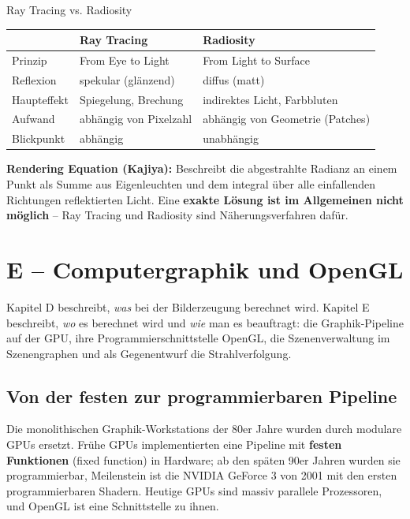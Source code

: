 \documentclass[12pt, a4paper]{article}
\begin{document}
\begin{notebox}{Ray Tracing vs. Radiosity}
\begin{tabular}{lll}
  & \textbf{Ray Tracing} & \textbf{Radiosity} \\
  \hline
  Prinzip & From Eye to Light & From Light to Surface \\
  Reflexion & spekular (glänzend) & diffus (matt) \\
  Haupteffekt & Spiegelung, Brechung & indirektes Licht, Farbbluten \\
  Aufwand & abhängig von Pixelzahl & abhängig von Geometrie (Patches) \\
  Blickpunkt & abhängig & unabhängig \\
\end{tabular}
\end{notebox}

\textbf{Rendering Equation (Kajiya):} Beschreibt die abgestrahlte Radianz an einem Punkt als Summe aus Eigenleuchten und dem integral über alle einfallenden Richtungen reflektierten Licht. Eine \textbf{exakte Lösung ist im Allgemeinen nicht möglich} -- Ray Tracing und Radiosity sind Näherungsverfahren dafür.

\section{E -- Computergraphik und OpenGL}

Kapitel D beschreibt, \textit{was} bei der Bilderzeugung berechnet wird. Kapitel E
beschreibt, \textit{wo} es berechnet wird und \textit{wie} man es beauftragt: die
Graphik-Pipeline auf der GPU, ihre Programmierschnittstelle OpenGL, die
Szenenverwaltung im Szenengraphen und als Gegenentwurf die Strahlverfolgung.

\subsection{Von der festen zur programmierbaren Pipeline}

Die monolithischen Graphik-Workstations der 80er Jahre wurden durch modulare GPUs
ersetzt. Frühe GPUs implementierten eine Pipeline mit \textbf{festen Funktionen}
(fixed function) in Hardware; ab den späten 90er Jahren wurden sie programmierbar,
Meilenstein ist die NVIDIA GeForce 3 von 2001 mit den ersten programmierbaren Shadern.
Heutige GPUs sind massiv parallele Prozessoren, und OpenGL ist eine Schnittstelle zu
ihnen.
\end{document}
